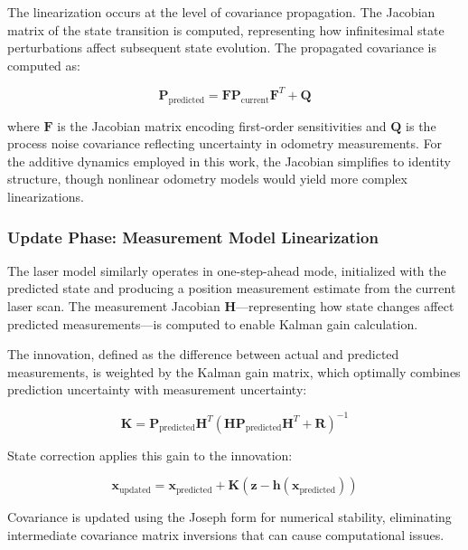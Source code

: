 \documentclass[conference]{IEEEtran}
\begin{document}
The linearization occurs at the level of covariance propagation. The Jacobian matrix of the state transition is computed, representing how infinitesimal state perturbations affect subsequent state evolution. The propagated covariance is computed as:

\begin{equation}
    \mathbf{P}_{\text{predicted}} = \mathbf{F} \mathbf{P}_{\text{current}} \mathbf{F}^T + \mathbf{Q}
\end{equation}

where $\mathbf{F}$ is the Jacobian matrix encoding first-order sensitivities and $\mathbf{Q}$ is the process noise covariance reflecting uncertainty in odometry measurements. For the additive dynamics employed in this work, the Jacobian simplifies to identity structure, though nonlinear odometry models would yield more complex linearizations.

\subsubsection{Update Phase: Measurement Model Linearization}

The laser model similarly operates in one-step-ahead mode, initialized with the predicted state and producing a position measurement estimate from the current laser scan. The measurement Jacobian $\mathbf{H}$—representing how state changes affect predicted measurements—is computed to enable Kalman gain calculation.

The innovation, defined as the difference between actual and predicted measurements, is weighted by the Kalman gain matrix, which optimally combines prediction uncertainty with measurement uncertainty:

\begin{equation}
    \mathbf{K} = \mathbf{P}_{\text{predicted}} \mathbf{H}^T (\mathbf{H} \mathbf{P}_{\text{predicted}} \mathbf{H}^T + \mathbf{R})^{-1}
\end{equation}

State correction applies this gain to the innovation:

\begin{equation}
    \mathbf{x}_{\text{updated}} = \mathbf{x}_{\text{predicted}} + \mathbf{K}(\mathbf{z} - \mathbf{h}(\mathbf{x}_{\text{predicted}}))
\end{equation}

Covariance is updated using the Joseph form for numerical stability, eliminating intermediate covariance matrix inversions that can cause computational issues.
\end{document}
